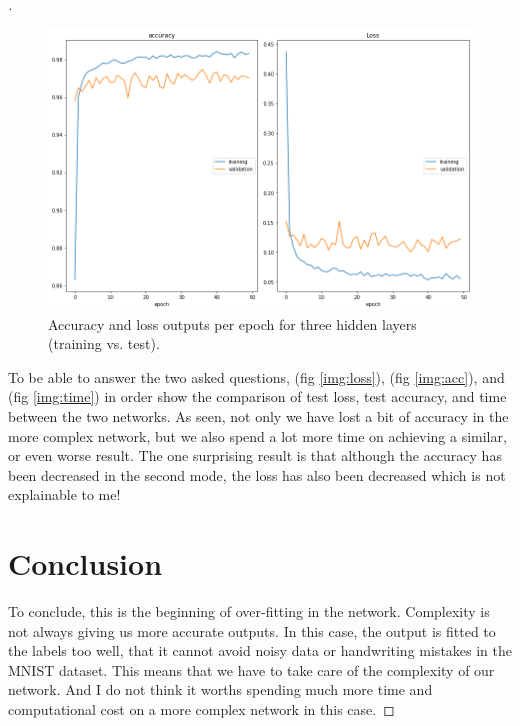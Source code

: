 \documentclass[12pt,oneside,geqno]{article}
\begin{document}
\begin{proof}[\color{red}{Solution}]
		\begin{figure}
			\centering
			\includegraphics[width=\textwidth]{../figs/net_ii.png}
			\caption{Accuracy and loss outputs per epoch for three hidden layers (training vs. test).}
			\label{img:net_ii}
		\end{figure}
		
		To be able to answer the two asked questions, (fig \ref{img:loss}), (fig \ref{img:acc}), and (fig \ref{img:time}) in order show the comparison of test loss, test accuracy, and time between the two networks. As seen, not only we have lost a bit of accuracy in the more complex network, but we also spend a lot more time on achieving a similar, or even worse result. The one surprising result is that although the accuracy has been decreased in the second mode, the loss has also been decreased which is not explainable to me!
		
		\section{Conclusion}
		To conclude, this is the beginning of over-fitting in the network. Complexity is not always giving us more accurate outputs. In this case, the output is fitted to the labels too well, that it cannot avoid noisy data or handwriting mistakes in the MNIST dataset. This means that we have to take care of the complexity of our network. And I do not think it worths spending much more time and computational cost on a more complex network in this case. 
		

\end{proof}
\end{document}
